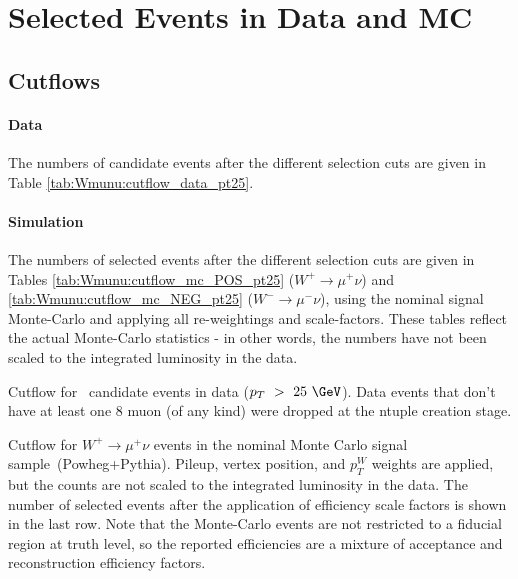 \section{Selected Events in Data and MC}

\subsection{Cutflows}

\paragraph{Data}

The numbers of candidate events after the different selection cuts are given in Table \ref{tab:Wmunu:cutflow_data_pt25}.

\paragraph{Simulation}

The numbers of selected events after the different selection cuts are given in Tables \ref{tab:Wmunu:cutflow_mc_POS_pt25} ($W^{+} \rightarrow \mu^{+} \nu$) and \ref{tab:Wmunu:cutflow_mc_NEG_pt25} ($W^{-} \rightarrow \mu^{-} \nu$), using the nominal signal Monte-Carlo and applying all re-weightings and scale-factors. These tables reflect the actual Monte-Carlo statistics - in other words, the numbers have not been scaled to the integrated luminosity in the data.

\begin{table}
\begin{center}

\caption{ Cutflow for \Wmn\ candidate events in data ($p_T~>~25~\GeV$). Data events that don't have at least one 8 \GeV muon (of any kind) were dropped at the ntuple creation stage.}
\label{tab:Wmunu:cutflow_data_pt25}
\end{center}
\end{table}


\begin{table}
\begin{center}

\caption{ Cutflow for $W^{+} \rightarrow \mu^{+} \nu$ events in the nominal Monte Carlo signal sample~(Powheg+Pythia). Pileup, vertex position, and $p_T^{W}$  weights are applied, but the counts are not scaled to the integrated luminosity in the data. The number of selected events after the application of efficiency scale factors is shown in the last row. Note that the Monte-Carlo events are not restricted to a fiducial region at truth level, so the reported efficiencies are a mixture of acceptance and reconstruction efficiency factors. }
\label{tab:Wmunu:cutflow_mc_POS_pt25}
\end{center}
\end{table}


